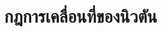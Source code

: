 \renewcommand{\theequation}{\thechapter.\arabic{equation}}

\chapter{กฎการเคลื่อนที่ของนิวตัน}
\label{Chapter:NewtonLaw}
\renewcommand{\thesection}{\thechapter.\arabic{section}}
\renewcommand{\theequation}{\thesection.\arabic{equation}}








